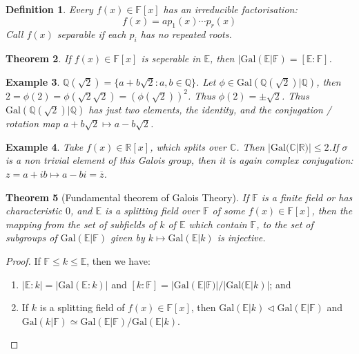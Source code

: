 \documentclass[a4paper,10pt]{article}
\newcommand{\CC}{\mathbb{C}}
\newcommand{\RR}{\mathbb{R}}
\newcommand{\QQ}{\mathbb{Q}}
\newcommand{\EE}{\mathbb{E}}
\newcommand{\FF}{\mathbb{F}}
\newtheorem{thm}{Theorem}
\newtheorem{Def}[thm]{Definition}
\newtheorem{eg}[thm]{Example}
\begin{document}
\begin{Def}
Every $f(x) \in \FF[x]$ has an irreducible factorisation:
\[ f(x) = a p_1(x) \cdots p_r(x) \]
Call $f(x)$ separable if each $p_i$ has no repeated roots. 
\end{Def}

\begin{thm}
If $f(x) \in \FF[x]$ is seperable in  $\EE$, then $|\text{Gal}(\EE | \FF) = [\EE : \FF]$.
\end{thm}

\begin{eg}
$\QQ(\sqrt{2}) = \{ a + b \sqrt{2} : a,b \in \QQ \}$. Let $\phi \in \text{Gal}(\QQ(\sqrt{2}) | \QQ)$, then $2 = \phi(2) = \phi( \sqrt{2} \sqrt{2}) = (\phi(\sqrt{2}))^2$. Thus $\phi(2) = \pm \sqrt{2}$. Thus $\text{Gal}( \QQ(\sqrt{2}) | \QQ)$ has just two elements, the identity, and the conjugation / rotation map $a + b \sqrt{2} \mapsto a - b \sqrt{2}$.  
\end{eg}

\begin{eg}
Take $f(x) \in \RR[x]$, which splits over $\CC$. Then $|\text{Gal}( \CC | \RR)| \leq 2$.If $\sigma$ is a non trivial element of this Galois group, then it is again complex conjugation: $z = a + ib \mapsto a - bi = \overline{z}$. 
\end{eg}

\begin{thm}[Fundamental theorem of Galois Theory]
If $\FF$ is a finite field or has characteristic $0$, and $\EE$ is a splitting field over $\FF$ of some $f(x) \in \FF[x]$, then the mapping from the set of subfields of $k$ of $\EE$ which contain $\FF$, to the set of subgroups of $\text{Gal}(\EE | \FF)$ given by $k \mapsto \text{Gal}(\EE | k)$ is injective. 
\end{thm}

\begin{proof}
If $\FF \leq k \leq \EE$, then we have:
\begin{enumerate}
\item $|\EE : k| = | \text{Gal}( \EE : k )|$ and $[k : \FF] = | \text{Gal}(\EE | \FF) | / |\text{Gal}(\EE |k )|$; and
\item If $k$ is a splitting field of $f(x) \in \FF[x]$, then $\text{Gal}(\EE | k ) \triangleleft \text{Gal}( \EE | \FF )$ and $\text{Gal}(k | \FF) \simeq \text{Gal}(\EE | \FF) / \text{Gal}(\EE | k)$. 
\end{enumerate}

\end{proof}
\end{document}
